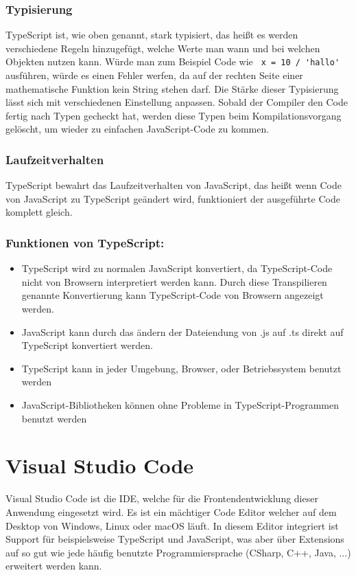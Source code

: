 \subsubsection{Typisierung}
TypeScript ist, wie oben genannt, stark typisiert, das heißt es werden verschiedene Regeln hinzugefügt, welche Werte man wann und
bei welchen Objekten nutzen kann. Würde man zum Beispiel Code wie \lstinline | x = 10 / 'hallo' | ausführen, würde es einen Fehler
werfen, da auf der rechten Seite einer mathematische Funktion kein String stehen darf. Die Stärke dieser Typisierung lässt sich mit
verschiedenen Einstellung anpassen. Sobald der Compiler den Code fertig nach Typen gecheckt hat, werden diese Typen beim 
Kompilationsvorgang gelöscht, um wieder zu einfachen JavaScript-Code zu kommen.

\subsubsection{Laufzeitverhalten}
TypeScript bewahrt das Laufzeitverhalten von JavaScript, das heißt wenn Code von JavaScript zu TypeScript geändert wird, funktioniert 
der ausgeführte Code komplett gleich.\cite{typescript1}

\subsubsection{Funktionen von TypeScript:}
\begin{itemize}
    \item TypeScript wird zu normalen JavaScript konvertiert, da TypeScript-Code nicht von Browsern interpretiert werden kann.
    Durch diese Transpilieren genannte Konvertierung kann TypeScript-Code von Browsern angezeigt werden.
    \item JavaScript kann durch das ändern der Dateiendung von .js auf .ts direkt auf TypeScript konvertiert werden.
    \item TypeScript kann in jeder Umgebung, Browser, oder Betriebssystem benutzt werden
    \item JavaScript-Bibliotheken können ohne Probleme in TypeScript-Programmen benutzt werden \cite{typescript2}
\end{itemize}

\section{Visual Studio Code}
Visual Studio Code ist die IDE, welche für die Frontendentwicklung dieser Anwendung eingesetzt wird. Es ist ein mächtiger
Code Editor welcher auf dem Desktop von Windows, Linux oder macOS läuft. In diesem Editor integriert ist Support für 
beispielsweise TypeScript und JavaScript, was aber über Extensions auf so gut wie jede häufig benutzte Programmiersprache
(CSharp, C++, Java, ...) erweitert werden kann. 

